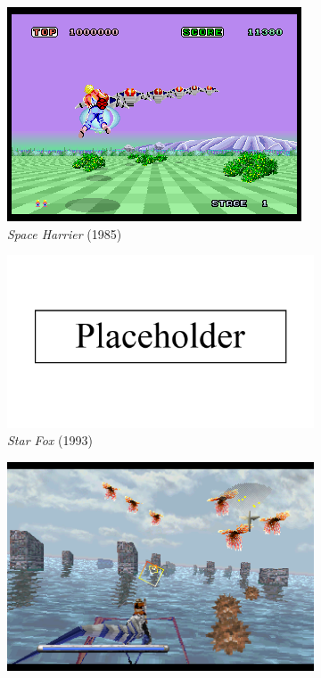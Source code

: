 \documentclass{article}
\begin{document}
\begin{figure}[h]
\begin{subfigure}{.5\textwidth}
  \centering
  \includegraphics[width=.8\linewidth]{spaceharrier}
  \caption{\textit{Space Harrier} (1985)}
  \label{fig:sfig1}
\end{subfigure}
\begin{subfigure}{.5\textwidth}
  \centering
  \includegraphics[width=.8\linewidth]{placeholder}
  \caption{\textit{Star Fox} (1993)}
  \label{fig:sfig2}
\end{subfigure}
\begin{subfigure}{.5\textwidth}
  \centering
  \includegraphics[width=.8\linewidth]{panzerdragoon}

\end{subfigure}
\end{figure}
\end{document}
